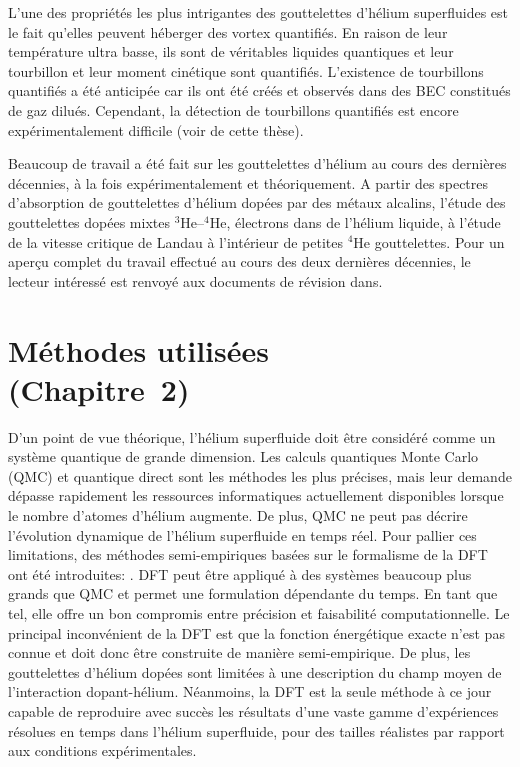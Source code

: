 		L'une des propriétés les plus intrigantes des gouttelettes d'hélium superfluides est le fait qu'elles peuvent héberger des vortex quantifiés. En raison de leur température ultra basse, ils sont de véritables liquides quantiques et leur tourbillon et leur moment cinétique sont quantifiés. L'existence de tourbillons quantifiés a été anticipée car ils ont été créés et observés dans des BEC constitués de gaz dilués. Cependant, la détection de tourbillons quantifiés est encore expérimentalement difficile (voir  de cette thèse).

		Beaucoup de travail a été fait sur les gouttelettes d'hélium au cours des dernières décennies, à la fois expérimentalement et théoriquement. A partir des spectres d'absorption de gouttelettes d'hélium dopées par des métaux alcalins, l'étude des gouttelettes dopées mixtes $^3$He--$^4$He, électrons dans de l'hélium liquide, à l'étude de la vitesse critique de Landau à l'intérieur de petites $^4$He gouttelettes. Pour un aperçu complet du travail effectué au cours des deux dernières décennies, le lecteur intéressé est renvoyé aux documents de révision dans.
	
	\section*{Méthodes utilisées\\\small(Chapitre~2)}
		D'un point de vue théorique, l'hélium superfluide doit être considéré comme un système quantique de grande dimension. Les calculs quantiques Monte Carlo\citep{Kro02} (QMC) et quantique direct\citep{deL06,deL10,Agu13} sont les méthodes les plus précises, mais leur demande dépasse rapidement les ressources informatiques actuellement disponibles lorsque le nombre d'atomes d'hélium augmente. De plus, QMC ne peut pas décrire l'évolution dynamique de l'hélium superfluide en temps réel. Pour pallier ces limitations, des méthodes semi-empiriques basées sur le formalisme de la DFT ont été introduites: \citep{Str87a,Str87b,Dal95}. DFT peut être appliqué à des systèmes beaucoup plus grands que QMC et permet une formulation dépendante du temps. En tant que tel, elle offre un bon compromis entre précision et faisabilité computationnelle. Le principal inconvénient de la DFT est que la fonction énergétique exacte n'est pas connue et doit donc être construite de manière semi-empirique. De plus, les gouttelettes d'hélium dopées sont limitées à une description du champ moyen de l'interaction dopant-hélium. Néanmoins, la DFT est la seule méthode à ce jour capable de reproduire avec succès les résultats d'une vaste gamme d'expériences résolues en temps dans l'hélium superfluide, pour des tailles réalistes par rapport aux conditions expérimentales.

